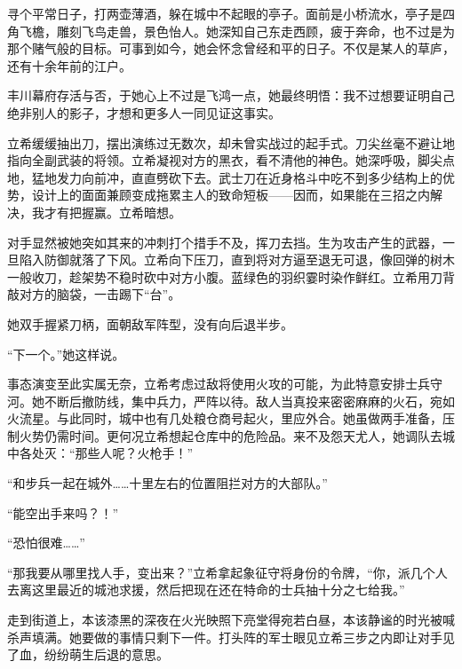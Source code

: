\documentclass{article}
\begin{document}
寻个平常日子，打两壶薄酒，躲在城中不起眼的亭子。面前是小桥流水，亭子是四角飞檐，雕刻飞鸟走兽，景色怡人。她深知自己东走西顾，疲于奔命，也不过是为那个赌气般的目标。可事到如今，她会怀念曾经和平的日子。不仅是某人的草庐，还有十余年前的江户。



丰川幕府存活与否，于她心上不过是飞鸿一点，她最终明悟：我不过想要证明自己绝非别人的影子，才想和更多人一同见证这事实。



立希缓缓抽出刀，摆出演练过无数次，却未曾实战过的起手式。刀尖丝毫不避让地指向全副武装的将领。立希凝视对方的黑衣，看不清他的神色。她深呼吸，脚尖点地，猛地发力向前冲，直直劈砍下去。武士刀在近身格斗中吃不到多少结构上的优势，设计上的面面兼顾变成拖累主人的致命短板——因而，如果能在三招之内解决，我才有把握赢。立希暗想。



对手显然被她突如其来的冲刺打个措手不及，挥刀去挡。生为攻击产生的武器，一旦陷入防御就落了下风。立希向下压刀，直到将对方逼至退无可退，像回弹的树木一般收刀，趁架势不稳时砍中对方小腹。蓝绿色的羽织霎时染作鲜红。立希用刀背敲对方的脑袋，一击踢下“台”。



她双手握紧刀柄，面朝敌军阵型，没有向后退半步。



“下一个。”她这样说。



事态演变至此实属无奈，立希考虑过敌将使用火攻的可能，为此特意安排士兵守河。她不断后撤防线，集中兵力，严阵以待。敌人当真投来密密麻麻的火石，宛如火流星。与此同时，城中也有几处粮仓商号起火，里应外合。她虽做两手准备，压制火势仍需时间。更何况立希想起仓库中的危险品。来不及怨天尤人，她调队去城中各处灭：“那些人呢？火枪手！”



“和步兵一起在城外……十里左右的位置阻拦对方的大部队。”



“能空出手来吗？！”



“恐怕很难……”



“那我要从哪里找人手，变出来？”立希拿起象征守将身份的令牌，“你，派几个人去离这里最近的城池求援，然后把现在还在特命的士兵抽十分之七给我。”



走到街道上，本该漆黑的深夜在火光映照下亮堂得宛若白昼，本该静谧的时光被喊杀声填满。她要做的事情只剩下一件。打头阵的军士眼见立希三步之内即让对手见了血，纷纷萌生后退的意思。
\end{document}
